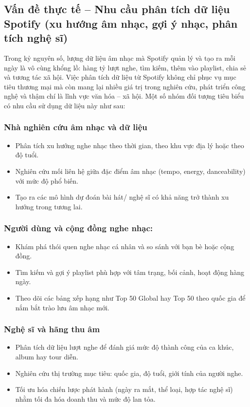 \documentclass{../hcmut-report}
\begin{document}
\subsection{Vấn đề thực tế – Nhu cầu phân tích dữ liệu Spotify (xu hướng âm nhạc, gợi ý nhạc, phân tích nghệ sĩ)}
Trong kỷ nguyên số, lượng dữ liệu âm nhạc mà Spotify quản lý và tạo ra mỗi ngày là vô cùng khổng lồ: hàng tỷ lượt nghe, tìm kiếm, thêm vào playlist, chia sẻ và tương tác xã hội. Việc phân tích dữ liệu từ Spotify không chỉ phục vụ mục tiêu thương mại mà còn mang lại nhiều giá trị trong nghiên cứu, phát triển công nghệ và thậm chí là lĩnh vực văn hóa – xã hội. Một số nhóm đối tượng tiêu biểu có nhu cầu sử dụng dữ liệu này như sau:\\
\subsubsection{Nhà nghiên cứu âm nhạc và dữ liệu}
\begin{itemize}
    \item Phân tích xu hướng nghe nhạc theo thời gian, theo khu vực địa lý hoặc theo độ tuổi.

    \item Nghiên cứu mối liên hệ giữa đặc điểm âm nhạc (tempo, energy, danceability) với mức độ phổ biến.

    \item Tạo ra các mô hình dự đoán bài hát/ nghệ sĩ có khả năng trở thành xu hướng trong tương lai.
\end{itemize}
\subsubsection{Người dùng và cộng đồng nghe nhạc:}
\begin{itemize}
    \item Khám phá thói quen nghe nhạc cá nhân và so sánh với bạn bè hoặc cộng đồng.

    \item Tìm kiếm và gợi ý playlist phù hợp với tâm trạng, bối cảnh, hoạt động hàng ngày.
    
    \item Theo dõi các bảng xếp hạng như Top 50 Global hay Top 50 theo quốc gia để nắm bắt trào lưu âm nhạc mới.
\end{itemize}

\subsubsection{Nghệ sĩ và hãng thu âm}
\begin{itemize}
    \item Phân tích dữ liệu lượt nghe để đánh giá mức độ thành công của ca khúc, album hay tour diễn.

    \item Nghiên cứu thị trường mục tiêu: quốc gia, độ tuổi, giới tính của người nghe.

    \item Tối ưu hóa chiến lược phát hành (ngày ra mắt, thể loại, hợp tác nghệ sĩ) nhằm tối đa hóa doanh thu và mức độ lan tỏa.
\end{itemize}
\end{document}
